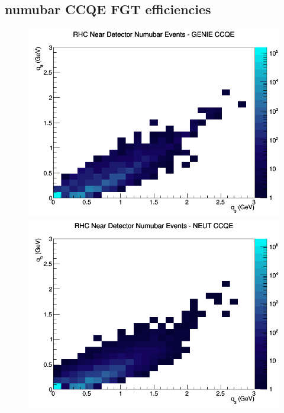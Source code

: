 \documentclass[12pt]{article}
\begin{document}
\subsection{numubar CCQE FGT efficiencies}
\begin{figure}[h]
\includegraphics[width=\linewidth]{eff_q0_q3/FGT/CCQE_RHC_ND_numubar_q3_q0_GENIE.png}
\endminipage
{}
\includegraphics[width=\linewidth]{eff_q0_q3/FGT/CCQE_RHC_ND_numubar_q3_q0_NEUT.png}
\endminipage
{}

\end{figure}
\end{document}
